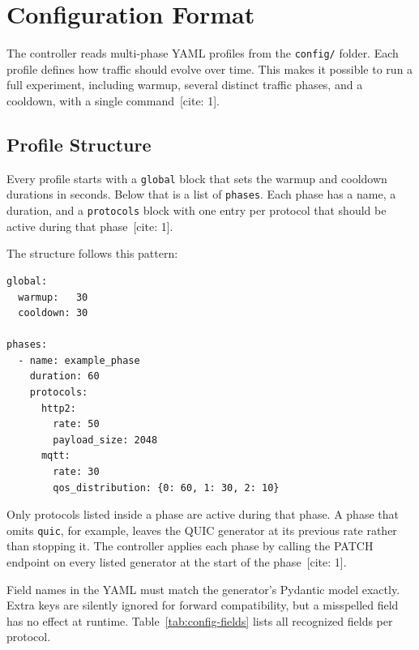 \section{Configuration Format}

\noindent The controller reads multi-phase YAML profiles from the \texttt{config/} folder.
Each profile defines how traffic should evolve over time.
This makes it possible to run a full experiment, including warmup, several distinct
traffic phases, and a cooldown, with a single command~[cite: 1].

\subsection{Profile Structure}

\noindent Every profile starts with a \texttt{global} block that sets the warmup and cooldown
durations in seconds.
Below that is a list of \texttt{phases}.
Each phase has a name, a duration, and a \texttt{protocols} block with one entry
per protocol that should be active during that phase~[cite: 1].

\noindent The structure follows this pattern:

\begin{verbatim}
global:
  warmup:   30
  cooldown: 30

phases:
  - name: example_phase
    duration: 60
    protocols:
      http2:
        rate: 50
        payload_size: 2048
      mqtt:
        rate: 30
        qos_distribution: {0: 60, 1: 30, 2: 10}
\end{verbatim}

\noindent Only protocols listed inside a phase are active during that phase.
A phase that omits \texttt{quic}, for example, leaves the QUIC generator at its previous
rate rather than stopping it.
The controller applies each phase by calling the PATCH endpoint on every listed generator
at the start of the phase~[cite: 1].

\noindent Field names in the YAML must match the generator's Pydantic model exactly.
Extra keys are silently ignored for forward compatibility, but a misspelled field has
no effect at runtime.
Table~\ref{tab:config-fields} lists all recognized fields per protocol.


